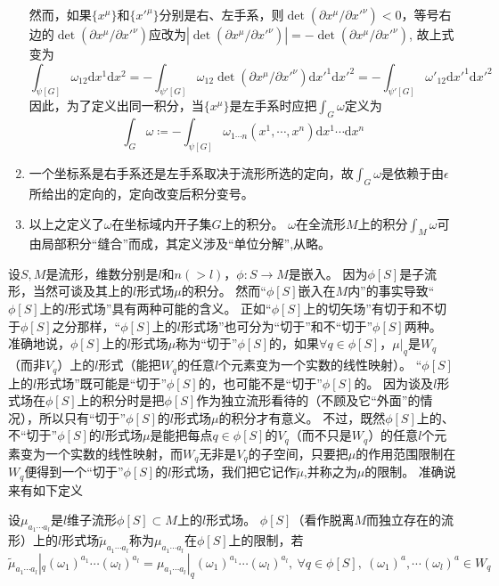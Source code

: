 \begin{note}
\begin{enumerate}[（1）]
        然而，如果$\{x^\mu\}$和$\{x'^\mu\}$分别是右、左手系，则$\det(\partial x^\mu / \partial x'^\nu) < 0$，等号右边的$\det(\partial x^\mu / \partial x'^\nu)$应改为$|\det(\partial x^\mu / \partial x'^\nu)| = -\det(\partial x^\mu / \partial x'^\nu)$, 故上式变为
        $$\int_{\psi[G]}\omega_{12}\mathrm{d}x^1\mathrm{d}x^2 = -\int_{\psi'[G]}\omega_{12}\det(\partial x^\mu / \partial x'^\nu)\mathrm{d}x'^1\mathrm{d}x'^2 = -\int_{\psi'[G]}\omega'_{12}\mathrm{d}x'^1\mathrm{d}x'^2$$
        因此，为了定义出同一积分，当$\{x^\mu\}$是左手系时应把$\displaystyle\int_G\omega$定义为
        $$\int_G\omega \coloneq -\int_{\psi[G]}\omega_{1 \cdots n}(x^1, \cdots, x^n)\mathrm{d}x^1 \cdots \mathrm{d}x^n$$
        \item 一个坐标系是右手系还是左手系取决于流形所选的定向，故$\displaystyle\int_G\omega$是依赖于由$\epsilon$所给出的定向的，定向改变后积分变号。
        \item 以上之定义了$\omega$在坐标域内开子集$G$上的积分。
        $\omega$在全流形$M$上的积分$\displaystyle\int_M\omega$可由局部积分``缝合''而成，其定义涉及``单位分解'',从略。
    \end{enumerate}
\end{note}

设$S, M$是流形，维数分别是$l$和$n(>l)$，$\phi \colon S \to M$是嵌入。
因为$\phi[S]$是子流形，当然可谈及其上的$l$形式场$\mu$的积分。
然而``$\phi[S]$嵌入在$M$内''的事实导致``$\phi[S]$上的$l$形式场''具有两种可能的含义。
正如``$\phi[S]$上的切矢场''有切于和不切于$\phi[S]$之分那样，``$\phi[S]$上的$l$形式场''也可分为``切于''和不``切于''$\phi[S]$两种。
准确地说，$\phi[S]$上的$l$形式场$\mu$称为``切于''$\phi[S]$的，如果$\forall q \in \phi[S]$，$\mu|_q$是$W_q$（而非$V_q$）上的$l$形式（能把$W_q$的任意$l$个元素变为一个实数的线性映射）。
``$\phi[S]$上的$l$形式场''既可能是``切于''$\phi[S]$的，也可能不是``切于''$\phi[S]$的。
因为谈及$l$形式场在$\phi[S]$上的积分时是把$\phi[S]$作为独立流形看待的（不顾及它``外面''的情况），所以只有``切于''$\phi[S]$的$l$形式场$\mu$的积分才有意义。
不过，既然$\phi[S]$上的、不``切于''$\phi[S]$的$l$形式场$\mu$是能把每点$q \in \phi[S]$的$V_q$（而不只是$W_q$）的任意$l$个元素变为一个实数的线性映射，而$W_q$无非是$V_q$的子空间，只要把$\mu$的作用范围限制在$W_q$便得到一个``切于''$\phi[S]$的$l$形式场，我们把它记作$\tilde\mu$,并称之为$\mu$的限制。
准确说来有如下定义

\begin{definition}
    设$\mu_{a_1 \cdots a_l}$是$l$维子流形$\phi[S] \subset M$上的$l$形式场。
    $\phi[S]$（看作脱离$M$而独立存在的流形）上的$l$形式场$\tilde\mu_{a_1 \cdots a_l}$称为$\mu_{a_1 \cdots a_l}$在$\phi[S]$上的限制，若
    $$\tilde\mu_{a_1 \cdots a_l}|_q(\omega_1)^{a_1} \cdots (\omega_l)^{a_l} = \mu_{a_1 \cdots a_l}|_q(\omega_1)^{a_1} \cdots (\omega_l)^{a_l}, ~ \forall q \in \phi[S], ~ (\omega_1)^a, \cdots (\omega_l)^a \in W_q$$
\end{definition}

